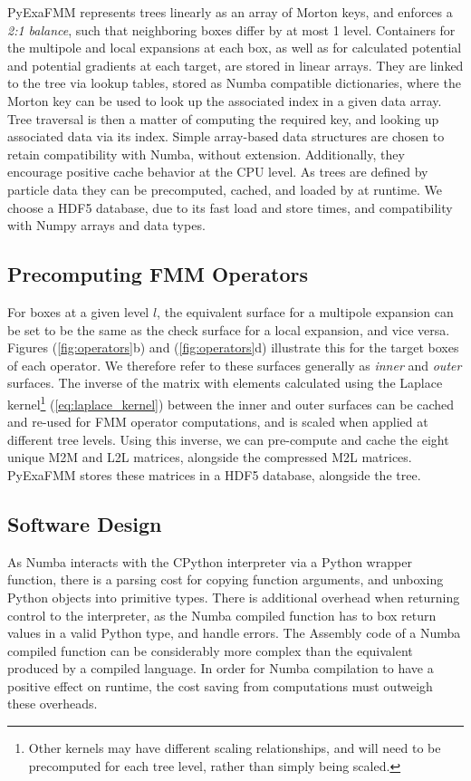 \documentclass{IEEEcsmag}
\begin{document}
PyExaFMM represents trees linearly as an array of Morton keys, and enforces a \textit{2:1 balance}, such that neighboring boxes differ by at most 1 level. Containers for the multipole and local expansions at each box, as well as for calculated potential and potential gradients at each target, are stored in linear arrays. They are linked to the tree via lookup tables, stored as Numba compatible dictionaries, where the Morton key can be used to look up the associated index in a given data array. Tree traversal is then a matter of computing the required key, and looking up associated data via its index. Simple array-based data structures are chosen to retain compatibility with Numba, without extension. Additionally, they encourage positive cache behavior at the CPU level. As trees are defined by particle data they can be precomputed, cached, and loaded by at runtime. We choose a HDF5 database, due to its fast load and store times, and compatibility with Numpy arrays and data types.

\subsection{Precomputing FMM Operators}

For boxes at a given level $l$, the equivalent surface for a multipole expansion can be set to be the same as the check surface for a local expansion, and vice versa. Figures (\ref{fig:operators}b) and (\ref{fig:operators}d) illustrate this for the target boxes of each operator. We therefore refer to these surfaces generally as \textit{inner} and \textit{outer} surfaces. The inverse of the matrix with elements calculated using the Laplace kernel\footnote{Other kernels may have different scaling relationships, and will need to be precomputed for each tree level, rather than simply being scaled.} (\ref{eq:laplace_kernel}) between the inner and outer surfaces can be cached and re-used for FMM operator computations, and is scaled when applied at different tree levels. Using this inverse, we can pre-compute and cache the eight unique M2M and L2L matrices, alongside the compressed M2L matrices. PyExaFMM stores these matrices in a HDF5 database, alongside the tree.

\subsection{Software Design}

As Numba interacts with the CPython interpreter via a Python wrapper function, there is a parsing cost for copying function arguments, and unboxing Python objects into primitive types. There is additional overhead when returning control to the interpreter, as the Numba compiled function has to box return values in a valid Python type, and handle errors. The Assembly code of a Numba compiled function can be considerably more complex than the equivalent produced by a compiled language. In order for Numba compilation to have a positive effect on runtime, the cost saving from computations must outweigh these overheads.
\end{document}
